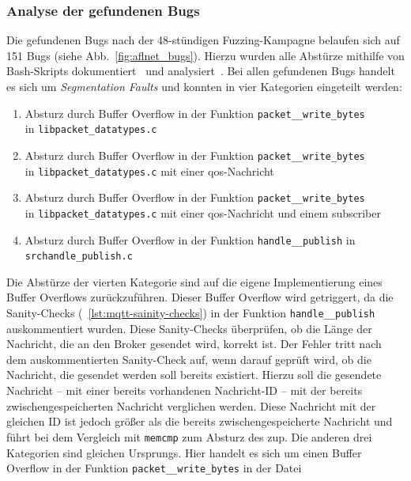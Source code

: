 \subsubsection{Analyse der gefundenen Bugs}\label{subsubsec:bugs}
Die gefundenen Bugs nach der 48-stündigen Fuzzing-Kampagne belaufen sich auf 151 Bugs (siehe Abb.~\ref{fig:aflnet_bugs}).
Hierzu wurden alle Abstürze mithilfe von Bash-Skripts dokumentiert~\cite{crash-extraction-script} und analysiert~\cite{analyse-crashes-script}.
Bei allen gefundenen Bugs handelt es sich um \textit{Segmentation Faults} und konnten in vier Kategorien eingeteilt werden:
\begin{enumerate}
    \item Absturz durch Buffer Overflow in der Funktion \texttt{packet\_\_write\_bytes} \\in \texttt{lib\/packet\_datatypes.c}
    \item Absturz durch Buffer Overflow in der Funktion \texttt{packet\_\_write\_bytes} \\in \texttt{lib\/packet\_datatypes.c}
    mit einer \gls{qos}-Nachricht
    \item Absturz durch Buffer Overflow in der Funktion \texttt{packet\_\_write\_bytes} \\in \texttt{lib\/packet\_datatypes.c}
    mit einer \gls{qos}-Nachricht und einem subscriber
    \item Absturz durch Buffer Overflow in der Funktion \texttt{handle\_\_publish} in \\\texttt{src\/handle\_publish.c}
\end{enumerate}
Die Abstürze der vierten Kategorie sind auf die eigene Implementierung eines Buffer Overflows zurückzuführen.
Dieser Buffer Overflow wird getriggert, da die Sanity-Checks (~\ref{lst:mqtt-sainity-checks}) in der Funktion \texttt{handle\_\_publish} auskommentiert
wurden.
Diese Sanity-Checks überprüfen, ob die Länge der Nachricht, die an den Broker gesendet wird, korrekt ist.
Der Fehler tritt nach dem auskommentierten Sanity-Check auf, wenn darauf geprüft wird, ob die Nachricht, die gesendet
werden soll bereits existiert.
Hierzu soll die gesendete Nachricht -- mit einer bereits vorhandenen Nachricht-ID -- mit der bereits zwischengespeicherten
Nachricht verglichen werden.
Diese Nachricht mit der gleichen ID ist jedoch größer als die bereits zwischengespeicherte Nachricht und führt bei dem
Vergleich mit \texttt{memcmp} zum Absturz des \gls{zup}.
\newline
Die anderen drei Kategorien sind gleichen Ursprungs.
Hier handelt es sich um einen Buffer Overflow in der Funktion \texttt{packet\_\_write\_bytes} in der Datei \\

